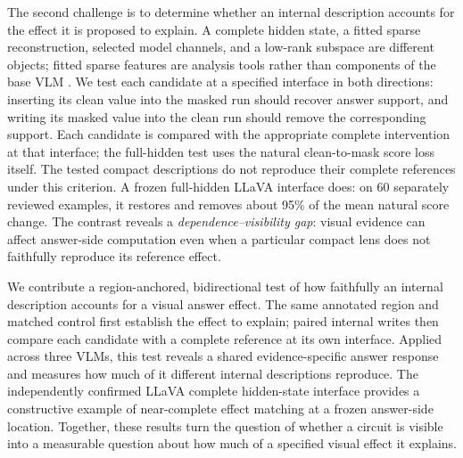 The second challenge is to determine whether an internal description accounts for the effect it is proposed to explain. A complete hidden state, a fitted sparse reconstruction, selected model channels, and a low-rank subspace are different objects; fitted sparse features are analysis tools rather than components of the base VLM \citep{dunefsky2024transcoders,ameisen2025circuittracing,geiger2024das,makelov2024subspace}. We test each candidate at a specified interface in both directions: inserting its clean value into the masked run should recover answer support, and writing its masked value into the clean run should remove the corresponding support. Each candidate is compared with the appropriate complete intervention at that interface; the full-hidden test uses the natural clean-to-mask score loss itself. The tested compact descriptions do not reproduce their complete references under this criterion. A frozen full-hidden LLaVA interface does: on 60 separately reviewed examples, it restores and removes about 95\% of the mean natural score change. The contrast reveals a \emph{dependence--visibility gap}: visual evidence can affect answer-side computation even when a particular compact lens does not faithfully reproduce its reference effect.

We contribute a region-anchored, bidirectional test of how faithfully an internal description accounts for a visual answer effect. The same annotated region and matched control first establish the effect to explain; paired internal writes then compare each candidate with a complete reference at its own interface. Applied across three VLMs, this test reveals a shared evidence-specific answer response and measures how much of it different internal descriptions reproduce. The independently confirmed LLaVA complete hidden-state interface provides a constructive example of near-complete effect matching at a frozen answer-side location. Together, these results turn the question of whether a circuit is visible into a measurable question about how much of a specified visual effect it explains.
